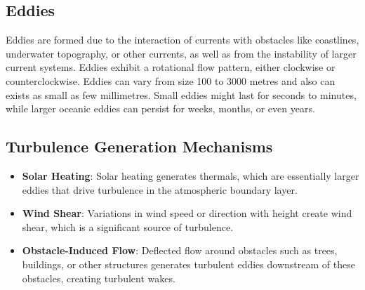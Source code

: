 \documentclass[fleqn,10pt]{SelfArx} %
\begin{document}
\subsection{Eddies}
Eddies are formed due to the interaction of currents with obstacles like coastlines, underwater topography, or other currents, as well as from the instability of larger current systems.
Eddies exhibit a rotational flow pattern, either clockwise or counterclockwise.
Eddies can vary from size 100 to 3000 metres and also can exists as small as few millimetres.
Small eddies might last for seconds to minutes, while larger oceanic eddies can persist for weeks, months, or even years.

\subsection{Turbulence Generation Mechanisms}
\begin{itemize} [noitemsep]
	\item \textbf{Solar Heating}: Solar heating generates thermals, which are essentially larger eddies that drive turbulence in the atmospheric boundary layer.
	\item \textbf{Wind Shear}: Variations in wind speed or direction with height create wind shear, which is a significant source of turbulence.
	\item \textbf{Obstacle-Induced Flow}: Deflected flow around obstacles such as trees, buildings, or other structures generates turbulent eddies downstream of these obstacles, creating turbulent wakes.
\end{itemize}

\begin{figure}[ht!]
	\centering
\end{figure}
\end{document}
